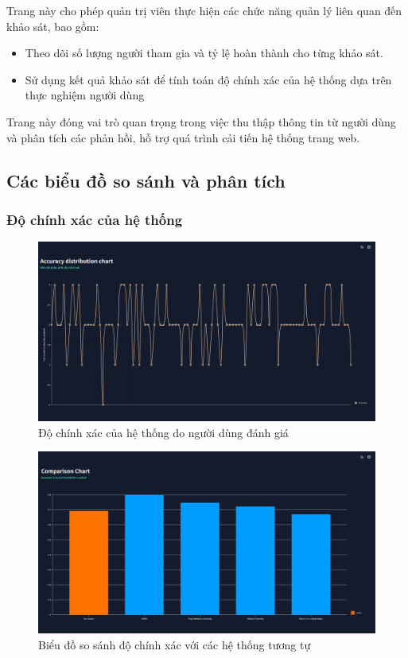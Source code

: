 Trang này cho phép quản trị viên thực hiện các chức năng quản lý liên quan đến khảo sát, bao gồm:
\begin{itemize}
    \item Theo dõi số lượng người tham gia và tỷ lệ hoàn thành cho từng khảo sát.
    \item Sử dụng kết quả khảo sát để tính toán độ chính xác của hệ thống dựa trên thực nghiệm người dùng
\end{itemize}

Trang này đóng vai trò quan trọng trong việc thu thập thông tin từ người dùng và phân tích các phản hồi, hỗ trợ quá trình cải tiến hệ thống trang web.

\subsection{Các biểu đồ so sánh và phân tích}
\label{sec:charts}
\subsubsection{Độ chính xác của hệ thống}

\begin{figure}[H]
    \centering
    \includegraphics[width=0.75\linewidth]{images/accu.png}
    \vspace{0.6cm}
    \caption{Độ chính xác của hệ thống do người dùng đánh giá}
\end{figure}

\begin{figure}[H]
    \centering
    \includegraphics[width=0.75\linewidth]{images/compare.png}
    \vspace{0.6cm}
    \caption{Biểu đồ so sánh độ chính xác với các hệ thống tương tự}
\end{figure}

